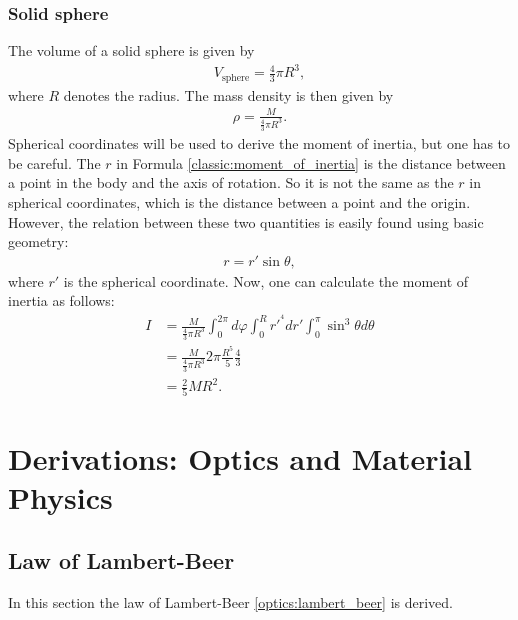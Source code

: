 \subsection{Solid sphere}

    The volume of a solid sphere is given by
    \begin{gather}
        V_\mathrm{sphere} = \frac{4}{3}\pi R^3,
    \end{gather}
    where $R$ denotes the radius. The mass density is then given by
    \begin{gather}
        \rho = \frac{M}{\frac{4}{3}\pi R^3}.
    \end{gather}
    Spherical coordinates will be used to derive the moment of inertia, but one has to be careful. The $r$ in Formula \ref{classic:moment_of_inertia} is the distance between a point in the body and the axis of rotation. So it is not the same as the $r$ in spherical coordinates, which is the distance between a point and the origin. However, the relation between these two quantities is easily found using basic geometry:
    \begin{gather}
        r = r'\sin\theta,
    \end{gather}
    where $r'$ is the spherical coordinate. Now, one can calculate the moment of inertia as follows:
    \begin{align}
        I &= \frac{M}{\frac{4}{3}\pi R^3} \int_0^{2\pi}d\varphi\int_0^Rr'^{^4}dr'\int_0^\pi\sin^3\theta d\theta\nonumber\\
        &= \frac{M}{\frac{4}{3}\pi R^3} 2\pi\frac{R^5}{5}\frac{4}{3}\nonumber\\
        &= \frac{2}{5}MR^2.
    \end{align}

\chapter{Derivations: Optics and Material Physics}

\section{Law of Lambert-Beer}

    In this section the law of Lambert-Beer \ref{optics:lambert_beer} is derived.

